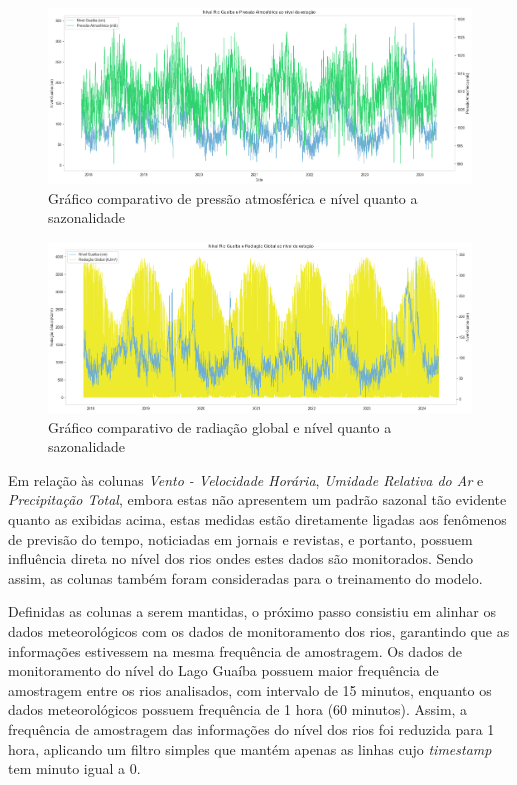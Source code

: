 \begin{figure}[H]
	\caption{\label{fig:comparacao_pressao_nivel_rio}Gráfico comparativo de pressão atmosférica e nível quanto a sazonalidade}
	\begin{center}
		\includegraphics[scale=0.35]{figuras/comparacao_pressao_nivel_rio.png}
	\end{center}
\end{figure}

\begin{figure}[H]
	\caption{\label{fig:comparacao_radiacao_nivel_rio}Gráfico comparativo de radiação global e nível quanto a sazonalidade}
	\begin{center}
		\includegraphics[scale=0.35]{figuras/comparacao_radiacao_nivel_rio.png}
	\end{center}
\end{figure}

Em relação às colunas \textit{Vento - Velocidade Horária}, \textit{Umidade Relativa do Ar} e \textit{Precipitação Total}, embora estas não apresentem um padrão sazonal tão evidente quanto as exibidas acima, estas medidas estão diretamente ligadas aos fenômenos de previsão do tempo, noticiadas em jornais e revistas, e portanto, possuem influência direta no nível dos rios ondes estes dados são monitorados. Sendo assim, as colunas também foram consideradas para o treinamento do modelo.

Definidas as colunas a serem mantidas, o próximo passo consistiu em alinhar os dados meteorológicos com os dados de monitoramento dos rios, garantindo que as informações estivessem na mesma frequência de amostragem. Os dados de monitoramento do nível do Lago Guaíba possuem maior frequência de amostragem entre os rios analisados, com intervalo de 15 minutos, enquanto os dados meteorológicos possuem frequência de 1 hora (60 minutos). Assim, a frequência de amostragem das informações do nível dos rios foi reduzida para 1 hora, aplicando um filtro simples que mantém apenas as linhas cujo \textit{timestamp} tem minuto igual a 0.

